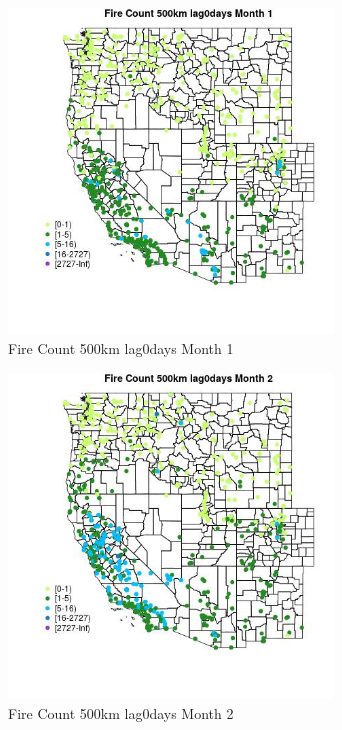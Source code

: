 \begin{figure} 
\centering  
\includegraphics[width=0.77\textwidth]{Code_Outputs/Report_ML_input_PM25_Step4_part_f_de_duplicated_aveswNAs_MapObsMo1Fire_Count_500km_lag0days.jpg} 
\caption{\label{fig:Report_ML_input_PM25_Step4_part_f_de_duplicated_aveswNAsMapObsMo1Fire_Count_500km_lag0days}Fire Count 500km lag0days Month 1} 
\end{figure} 
 

\clearpage 

\begin{figure} 
\centering  
\includegraphics[width=0.77\textwidth]{Code_Outputs/Report_ML_input_PM25_Step4_part_f_de_duplicated_aveswNAs_MapObsMo2Fire_Count_500km_lag0days.jpg} 
\caption{\label{fig:Report_ML_input_PM25_Step4_part_f_de_duplicated_aveswNAsMapObsMo2Fire_Count_500km_lag0days}Fire Count 500km lag0days Month 2} 
\end{figure} 
 

